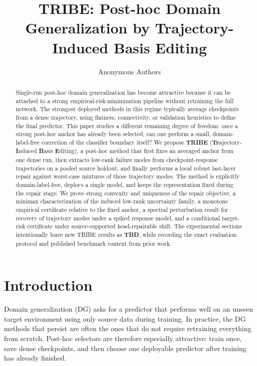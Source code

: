 \documentclass{article}
\title{TRIBE: Post-hoc Domain Generalization by Trajectory-Induced Basis Editing}
\author{Anonymous Authors}
\newcommand{\TBD}{\textbf{TBD}}
\newcommand{\tribe}{\textup{\textsc{TRIBE}}}
\newcommand{\1}{\mathbbm{1}}
\begin{document}
\maketitle

\begin{abstract}
Single-run post-hoc domain generalization has become attractive because it can be attached to a strong empirical-risk-minimization pipeline without retraining the full network. The strongest deployed methods in this regime typically average checkpoints from a dense trajectory, using flatness, connectivity, or validation heuristics to define the final predictor. This paper studies a different remaining degree of freedom: once a strong post-hoc anchor has already been selected, can one perform a small, domain-label-free correction of the classifier boundary itself? We propose \textbf{\tribe{}} (\textbf{Tr}ajectory-\textbf{I}nduced \textbf{B}asis \textbf{E}diting), a post-hoc method that first fixes an averaged anchor from one dense run, then extracts low-rank failure modes from checkpoint-response trajectories on a pooled source holdout, and finally performs a local robust last-layer repair against worst-case mixtures of those trajectory modes. The method is explicitly domain-label-free, deploys a single model, and keeps the representation fixed during the repair stage. We prove strong convexity and uniqueness of the repair objective, a minimax characterization of the induced low-rank uncertainty family, a monotone empirical certificate relative to the fixed anchor, a spectral perturbation result for recovery of trajectory modes under a spiked response model, and a conditional target-risk certificate under source-supported head-repairable shift. The experimental sections intentionally leave new \tribe{} results as \TBD{}, while recording the exact evaluation protocol and published benchmark context from prior work.
\end{abstract}

\section{Introduction}

Domain generalization (DG) asks for a predictor that performs well on an unseen target environment using only source data during training. In practice, the DG methods that persist are often the ones that do not require retraining everything from scratch. Post-hoc selectors are therefore especially attractive: train once, save dense checkpoints, and then choose one deployable predictor after training has already finished.
\end{document}
